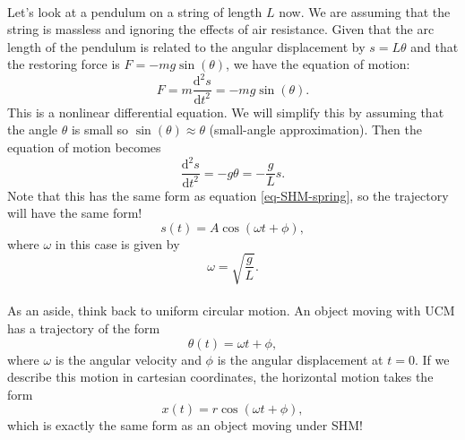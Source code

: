 \documentclass[../newtonian_mechanics.tex]{subfiles}
\begin{document}
        \paragraph{}
        Let's look at a pendulum on a string of length $L$ now.
        We are assuming that the string is massless and ignoring the effects of air resistance.
        Given that the arc length of the pendulum is related to the angular displacement by $s=L\theta$ and that the restoring force is $F=-mg\sin(\theta)$, we have the equation of motion:
        \begin{equation}
            F=m\frac{\mathrm{d}^2s}{\mathrm{d}t^2}=-mg\sin(\theta).
        \end{equation}
        This is a nonlinear differential equation. We will simplify this by assuming that the angle $\theta$ is small so $\sin(\theta)\approx\theta$ (small-angle approximation).
        Then the equation of motion becomes
        \begin{equation}
            \frac{\mathrm{d}^2s}{\mathrm{d}t^2}=-g\theta=-\frac{g}{L}s.
        \end{equation}
        Note that this has the same form as equation \ref{eq-SHM-spring}, so the trajectory will have the same form!
        \begin{equation}
            s(t)=A\cos(\omega t+\phi),
        \end{equation}
        where $\omega$ in this case is given by
        \begin{equation}
            \omega = \sqrt{\frac{g}{L}}.
        \end{equation}

        \paragraph{}
        As an aside, think back to uniform circular motion.
        An object moving with UCM has a trajectory of the form
        \begin{equation}
            \theta(t)=\omega t+\phi,
        \end{equation}
        where $\omega$ is the angular velocity and $\phi$ is the angular displacement at $t=0$.
        If we describe this motion in cartesian coordinates, the horizontal motion takes the form
        \begin{equation}
            x(t) = r\cos(\omega t+\phi),
        \end{equation}
        which is exactly the same form as an object moving under SHM!
\end{document}
